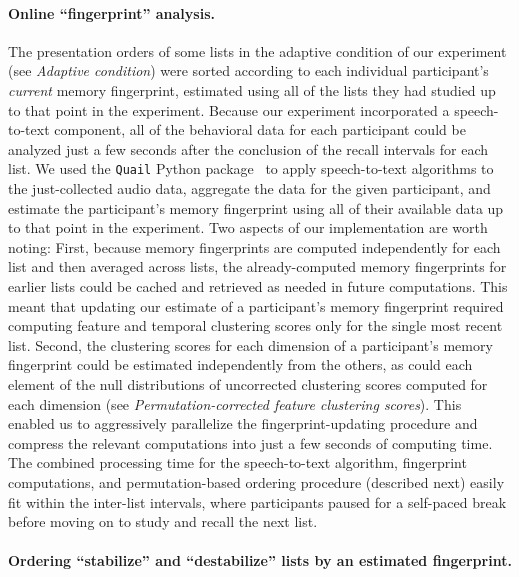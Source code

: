 \documentclass[11pt]{article}
\begin{document}
\paragraph{Online ``fingerprint'' analysis.}

The presentation orders of some lists in the adaptive condition of our
experiment (see \textit{Adaptive condition}) were sorted according to each
individual participant's \textit{current} memory fingerprint, estimated using
all of the lists they had studied up to that point in the experiment. Because
our experiment incorporated a speech-to-text component, all of the behavioral
data for each participant could be analyzed just a few seconds after the
conclusion of the recall intervals for each list. We used the \texttt{Quail}
Python package~\citep{HeusEtal17} to apply speech-to-text algorithms to the
just-collected audio data, aggregate the data for the given participant, and
estimate the participant's memory fingerprint using all of their available data
up to that point in the experiment. Two aspects of our implementation are worth
noting: First, because memory fingerprints are computed independently for each
list and then averaged across lists, the already-computed memory fingerprints
for earlier lists could be cached and retrieved as needed in future
computations. This meant that updating our estimate of a participant's memory
fingerprint required computing feature and temporal clustering scores only for
the single most recent list. Second, the clustering scores for each dimension
of a participant's memory fingerprint could be estimated independently from the
others, as could each element of the null distributions of uncorrected
clustering scores computed for each dimension (see
\textit{Permutation-corrected feature clustering scores}). This enabled us to
aggressively parallelize the fingerprint-updating procedure and compress the
relevant computations into just a few seconds of computing time. The combined
processing time for the speech-to-text algorithm, fingerprint computations, and
permutation-based ordering procedure (described next) easily fit within the
inter-list intervals, where participants paused for a self-paced break before
moving on to study and recall the next list.

\paragraph{Ordering ``stabilize'' and ``destabilize'' lists by an estimated
fingerprint.}
\end{document}
